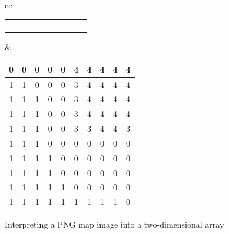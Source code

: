 \begin{figure}[H]
\begin{tabular}{cc}
{\begin{tabular}{|c|c|c|c|c|c|c|c|c|c|}
                \cellcolor{green} & \cellcolor{green} & \cellcolor{green} &
                \cellcolor{black} & \cellcolor{black} & \cellcolor{black} &
                \cellcolor{black} & \cellcolor{black} & \cellcolor{black} &
                \cellcolor{black} \\ \hline
                \cellcolor{green} & \cellcolor{green} & \cellcolor{green} &
                \cellcolor{green} & \cellcolor{black} & \cellcolor{black} &
                \cellcolor{black} & \cellcolor{black} & \cellcolor{black} &
                \cellcolor{black} \\ \hline
                \cellcolor{green} & \cellcolor{green} & \cellcolor{green} &
                \cellcolor{green} & \cellcolor{black} & \cellcolor{black} &
                \cellcolor{black} & \cellcolor{black} & \cellcolor{black} &
                \cellcolor{black} \\ \hline
                \cellcolor{green} & \cellcolor{green} & \cellcolor{green} &
                \cellcolor{green} & \cellcolor{green} & \cellcolor{black} &
                \cellcolor{black} & \cellcolor{black} & \cellcolor{black} &
                \cellcolor{black} \\ \hline
                \cellcolor{green} & \cellcolor{green} & \cellcolor{green} &
                \cellcolor{green} & \cellcolor{green} & \cellcolor{green} &
                \cellcolor{green} & \cellcolor{green} & \cellcolor{green} &
                \cellcolor{black} \\ \hline
            \end{tabular}
        }
        &
        {\footnotesize
            \setlength{\tabcolsep}{2.5pt}
            \begin{tabular}{|c|c|c|c|c|c|c|c|c|c|}
                \hline
                0 & 0 & 0 & 0 & 0 & 4 & 4 & 4 & 4 & 4 \\ \hline
                1 & 1 & 0 & 0 & 0 & 3 & 4 & 4 & 4 & 4 \\ \hline
                1 & 1 & 1 & 0 & 0 & 3 & 4 & 4 & 4 & 4 \\ \hline
                1 & 1 & 1 & 0 & 0 & 3 & 4 & 4 & 4 & 4 \\ \hline
                1 & 1 & 1 & 0 & 0 & 3 & 3 & 4 & 4 & 3 \\ \hline
                1 & 1 & 1 & 0 & 0 & 0 & 0 & 0 & 0 & 0 \\ \hline
                1 & 1 & 1 & 1 & 0 & 0 & 0 & 0 & 0 & 0 \\ \hline
                1 & 1 & 1 & 1 & 0 & 0 & 0 & 0 & 0 & 0 \\ \hline
                1 & 1 & 1 & 1 & 1 & 0 & 0 & 0 & 0 & 0 \\ \hline
                1 & 1 & 1 & 1 & 1 & 1 & 1 & 1 & 1 & 0 \\ \hline
            \end{tabular}
        }
    \end{tabular}
    \caption{Interpreting a PNG map image into a two-dimensional array}\label{fig:png_to_array} 
\end{figure}


